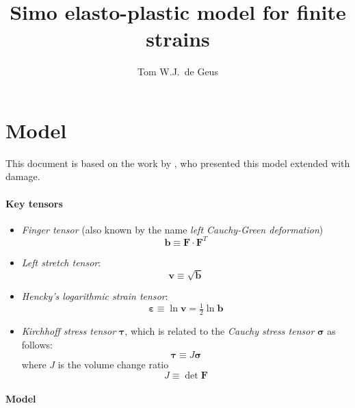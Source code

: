 \documentclass[namecite, fleqn]{goose-article}
\title{Simo elasto-plastic model for finite strains}
\author{Tom W.J.\ de Geus}
\newcommand\T[1]{\bm{{#1}}}
\begin{document}
\maketitle

\section{Model}

This document is based on the work by \citet{Geers2004},
who presented this model extended with damage.

\paragraph{Key tensors}

\begin{itemize}

    \item \emph{Finger tensor} (also known by the name \emph{left Cauchy-Green deformation})
    \begin{equation}
        \T{b} \equiv \T{F} \cdot \T{F}^T
    \end{equation}

    \item \emph{Left stretch tensor}:
    \begin{equation}
        \T{v} \equiv \sqrt{\T{b}}
    \end{equation}

    \item \emph{Hencky’s logarithmic strain tensor}:
    \begin{equation}
        \T{\varepsilon} \equiv \ln \T{v} = \tfrac{1}{2} \ln \T{b}
    \end{equation}

    \item \emph{Kirchhoff stress tensor} $\T{\tau}$, which is related to the
    \emph{Cauchy stress tensor} $\T{\sigma}$ as follows:
    \begin{equation}
        \T{\tau} \equiv J \T{\sigma}
    \end{equation}
    where $J$ is the volume change ratio
    \begin{equation}
        J \equiv \det \T{F}
    \end{equation}

\end{itemize}

\paragraph{Model}
\end{document}
